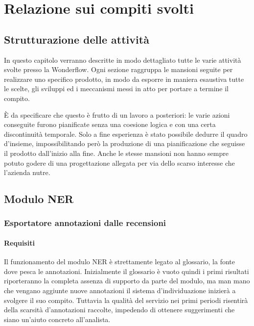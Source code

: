 
\chapter{Relazione sui compiti svolti}
\label{cap:relazione}

\section{Strutturazione delle attività}
In questo capitolo verranno descritte in modo dettagliato tutte le varie
attività svolte presso la Wonderflow. Ogni sezione raggruppa le mansioni seguite
per realizzare uno specifico prodotto, in modo da esporre in maniera esaustiva
tutte le scelte, gli sviluppi ed i meccanismi messi in atto per portare a
termine il compito.

È da specificare che questo è frutto di un lavoro a posteriori: le varie azioni
conseguite furono pianificate senza una coesione logica e con una certa
discontinuità temporale. Solo a fine esperienza è stato possibile dedurre il
quadro d'insieme, impossibilitando però la produzione di una pianificazione che
seguisse il prodotto dall'inizio alla fine. Anche le stesse mansioni non hanno
sempre potuto godere di una progettazione allegata per via dello scarso
interesse che l'azienda nutre.

\section{Modulo NER}
\label{sec:ner}
\subsection{Esportatore annotazioni dalle recensioni}
\subsubsection{Requisiti}
Il funzionamento del modulo NER è strettamente legato al glossario, la fonte
dove pesca le annotazioni. Inizialmente il glossario è vuoto quindi i primi
risultati riporteranno la completa assenza di supporto da parte del modulo, ma
man mano che vengano aggiunte nuove annotazioni il sistema d'individuazione
inizierà a svolgere il suo compito. Tuttavia la qualità del servizio nei primi
periodi risentirà della scarsità d'annotazioni raccolte, impedendo di ottenere
suggerimenti che siano un'aiuto concreto all'analista.

